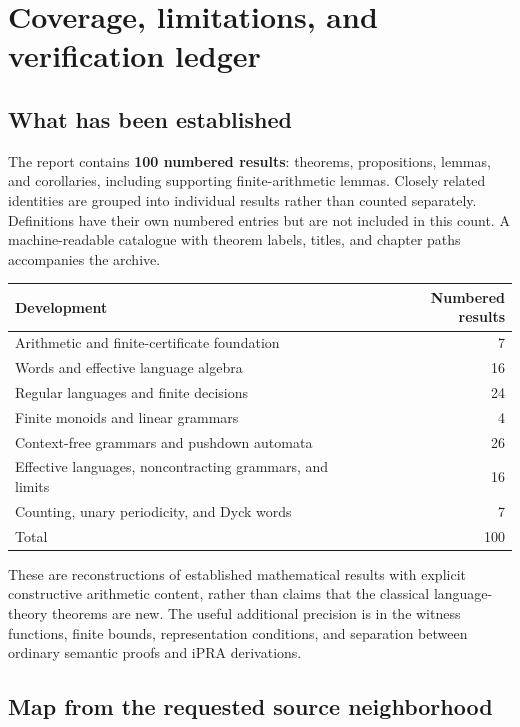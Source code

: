 \section{Coverage, limitations, and verification ledger}
\label{sec:audit}

\subsection{What has been established}

The report contains \textbf{100 numbered results}: theorems, propositions,
lemmas, and corollaries, including supporting finite-arithmetic lemmas.
Closely related identities are grouped into individual results rather than
counted separately. Definitions have their own numbered entries but are
not included in this count. A machine-readable catalogue with theorem
labels, titles, and chapter paths accompanies the archive.

\begin{center}
\begin{tabular}{@{}lr@{}}
\toprule
Development & Numbered results\\\midrule
Arithmetic and finite-certificate foundation & 7\\
Words and effective language algebra & 16\\
Regular languages and finite decisions & 24\\
Finite monoids and linear grammars & 4\\
Context-free grammars and pushdown automata & 26\\
Effective languages, noncontracting grammars, and limits & 16\\
Counting, unary periodicity, and Dyck words & 7\\\midrule
Total & 100\\\bottomrule
\end{tabular}
\end{center}

These are reconstructions of established mathematical results with explicit
constructive arithmetic content, rather than claims that the classical
language-theory theorems are new. The useful additional precision is in
the witness functions, finite bounds, representation conditions, and
separation between ordinary semantic proofs and iPRA derivations.

\subsection{Map from the requested source neighborhood}

